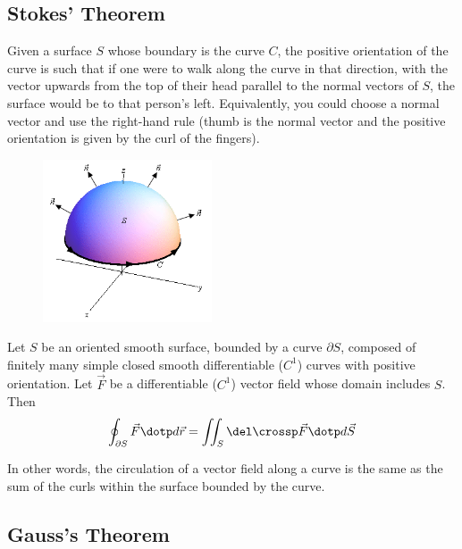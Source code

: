 \subsection{Stokes' Theorem}

\begin{definition}
  Given a surface $S$ whose boundary is the curve $C$, the positive orientation of the curve is such that if one were to walk along the curve in that direction, with the vector upwards from the top of their head parallel to the normal vectors of $S$, the surface would be to that person's left. Equivalently, you could choose a normal vector and use the right-hand rule (thumb is the normal vector and the positive orientation is given by the curl of the fingers).

  \begin{figure}[H]
    \centering
    \includegraphics[width=50mm]{content/mvc/images/positive-oriented-boundary.png}
  \end{figure}
\end{definition}

\begin{namedtheorem}
  Let $S$ be an oriented smooth surface, bounded by a curve $\partial S$, composed of finitely many simple closed smooth differentiable ($C^1$) curves with positive orientation. Let $\vec{F}$ be a differentiable ($C^1$) vector field whose domain includes $S$. Then
  \[
    \oint_{\partial S} \vec{F} \dotp d\vec{r} = \iint_S \del \crossp \vec{F} \dotp d\vec{S}
  \]

  In other words, the circulation of a vector field along a curve is the same as the sum of the curls within the surface bounded by the curve.
\end{namedtheorem}


\subsection{Gauss's Theorem}

